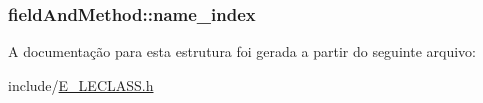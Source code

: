 \subsubsection[{name\+\_\+index}]{ field\+And\+Method\+::name\+\_\+index}\label{structfield_and_method_ac636d7076db5a2ce9891613be8ad9b00}


A documentação para esta estrutura foi gerada a partir do seguinte arquivo\+:\begin{DoxyCompactItemize}
\item 
include/\hyperlink{_e___l_e_c_l_a_s_s_8h}{E\+\_\+\+L\+E\+C\+L\+A\+S\+S.\+h}\end{DoxyCompactItemize}
